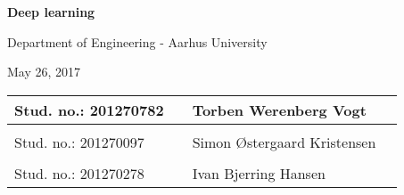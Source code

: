 
\centerline{\Huge\bfseries\color{ThemeColor} Deep learning}

\vspace{5em}
\centerline{\large\bfseries\color{BlackColor}}
\vspace{0.5em}
\centerline{\large\color{BlackColor}Department of Engineering - Aarhus University}

\vspace{0.5em}
\centerline{\large\color{BlackColor} May 26, 2017}



\vspace{25em}

\begin{center}
	\centerline{\large\color{BlackColor} }
	\vspace{5em}
   \begin{tabular}{ l p{3cm} l l }
    Stud. no.: 201270782 && Torben Werenberg Vogt & \\\hline
	& & \\
	Stud. no.: 201270097 && Simon Østergaard Kristensen & \\\hline
	& & \\
	Stud. no.: 201270278 && Ivan Bjerring Hansen & \\\hline
   \end{tabular}
\end{center}
\thispagestyle{empty} %
\restoregeometry

